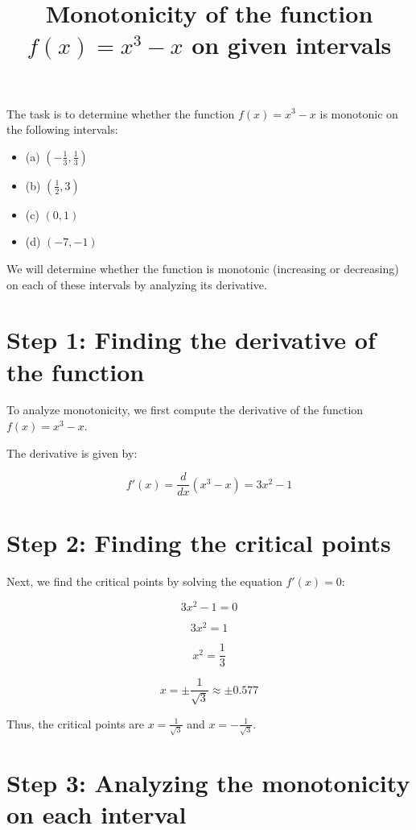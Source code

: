 \documentclass{article}
\title{Monotonicity of the function $f(x) = x^3 - x$ on given intervals}
\author{}
\date{}
\begin{document}
\maketitle

The task is to determine whether the function \( f(x) = x^3 - x \) is monotonic on the following intervals:

\begin{itemize}
    \item (a) \( \left( -\frac{1}{3}, \frac{1}{3} \right) \)
    \item (b) \( \left( \frac{1}{2}, 3 \right) \)
    \item (c) \( (0, 1) \)
    \item (d) \( (-7, -1) \)
\end{itemize}

We will determine whether the function is monotonic (increasing or decreasing) on each of these intervals by analyzing its derivative.

\section{Step 1: Finding the derivative of the function}

To analyze monotonicity, we first compute the derivative of the function \( f(x) = x^3 - x \).

The derivative is given by:

\[
f'(x) = \frac{d}{dx}(x^3 - x) = 3x^2 - 1
\]

\section{Step 2: Finding the critical points}

Next, we find the critical points by solving the equation \( f'(x) = 0 \):

\[
3x^2 - 1 = 0
\]

\[
3x^2 = 1
\]

\[
x^2 = \frac{1}{3}
\]

\[
x = \pm \frac{1}{\sqrt{3}} \approx \pm 0.577
\]

Thus, the critical points are \( x = \frac{1}{\sqrt{3}} \) and \( x = -\frac{1}{\sqrt{3}} \).

\section{Step 3: Analyzing the monotonicity on each interval}
\end{document}
